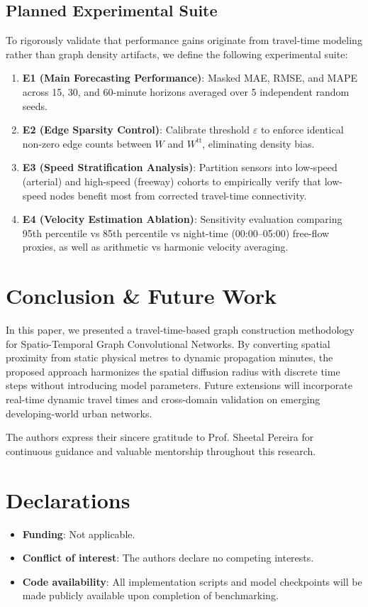 \documentclass[pdflatex,sn-mathphys-num]{sn-jnl}
\theoremstyle{thmstyleone}
\theoremstyle{thmstyletwo}
\theoremstyle{thmstylethree}
\begin{document}
\subsection{Planned Experimental Suite}
To rigorously validate that performance gains originate from travel-time modeling rather than graph density artifacts, we define the following experimental suite:
\begin{enumerate}
    \item \textbf{E1 (Main Forecasting Performance)}: Masked MAE, RMSE, and MAPE across 15, 30, and 60-minute horizons averaged over 5 independent random seeds.
    \item \textbf{E2 (Edge Sparsity Control)}: Calibrate threshold $\varepsilon$ to enforce identical non-zero edge counts between $W$ and $W^{\text{tt}}$, eliminating density bias.
    \item \textbf{E3 (Speed Stratification Analysis)}: Partition sensors into low-speed (arterial) and high-speed (freeway) cohorts to empirically verify that low-speed nodes benefit most from corrected travel-time connectivity.
    \item \textbf{E4 (Velocity Estimation Ablation)}: Sensitivity evaluation comparing 95th percentile vs 85th percentile vs night-time (00:00--05:00) free-flow proxies, as well as arithmetic vs harmonic velocity averaging.
\end{enumerate}

\section{Conclusion \& Future Work}\label{sec:conclusion}

In this paper, we presented a travel-time-based graph construction methodology for Spatio-Temporal Graph Convolutional Networks. By converting spatial proximity from static physical metres to dynamic propagation minutes, the proposed approach harmonizes the spatial diffusion radius with discrete time steps without introducing model parameters. Future extensions will incorporate real-time dynamic travel times and cross-domain validation on emerging developing-world urban networks.

\backmatter

The authors express their sincere gratitude to Prof. Sheetal Pereira for continuous guidance and valuable mentorship throughout this research.

\section*{Declarations}
\begin{itemize}
\item \textbf{Funding}: Not applicable.
\item \textbf{Conflict of interest}: The authors declare no competing interests.
\item \textbf{Code availability}: All implementation scripts and model checkpoints will be made publicly available upon completion of benchmarking.
\end{itemize}
\end{document}

